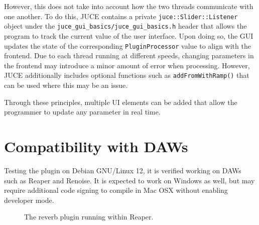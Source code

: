\begin{singlespace}

\end{singlespace} \hfill \break
\hspace*{0.6cm}However, this does not take into account how the two threads communicate with one another. To do this, JUCE contains a private \verb|juce::Slider::Listener| object under the \verb|juce_gui_basics/juce_gui_basics.h| header that allows the program to track the current value of the user interface. Upon doing so, the GUI updates the state of the corresponding \verb|PluginProcessor| value to align with the frontend. Due to each thread running at different speeds, changing parameters in the frontend may introduce a minor amount of error when processing. However, JUCE additionally includes optional functions such as \verb|addFromWithRamp()| that can be used where this may be an issue.

\begin{singlespace}

\end{singlespace} \hfill \break
\hspace*{0.6cm} Through these principles, multiple UI elements can be added that allow the programmer to update any parameter in real time.

\section{Compatibility with DAWs}
Testing the plugin on Debian GNU/Linux 12, it is verified working on DAWs such as Reaper and Renoise. It is expected to work on Windows as well, but may require additional code signing to compile in Mac OSX without enabling developer mode. \hfill \break

\clearpage

\begin{figure}[h] %
	\begin{center}
		\caption{The reverb plugin running within Reaper.}
	\end{center}
\end{figure}

